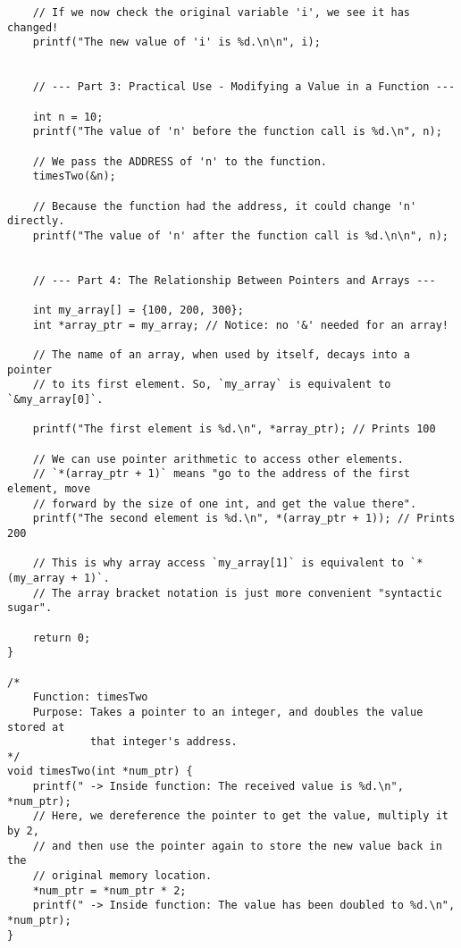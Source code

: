 \documentclass[11pt]{book}
\begin{document}
\begin{verbatim}
    // If we now check the original variable 'i', we see it has changed!
    printf("The new value of 'i' is %d.\n\n", i);


    // --- Part 3: Practical Use - Modifying a Value in a Function ---

    int n = 10;
    printf("The value of 'n' before the function call is %d.\n", n);

    // We pass the ADDRESS of 'n' to the function.
    timesTwo(&n);

    // Because the function had the address, it could change 'n' directly.
    printf("The value of 'n' after the function call is %d.\n\n", n);


    // --- Part 4: The Relationship Between Pointers and Arrays ---

    int my_array[] = {100, 200, 300};
    int *array_ptr = my_array; // Notice: no '&' needed for an array!

    // The name of an array, when used by itself, decays into a pointer
    // to its first element. So, `my_array` is equivalent to `&my_array[0]`.

    printf("The first element is %d.\n", *array_ptr); // Prints 100

    // We can use pointer arithmetic to access other elements.
    // `*(array_ptr + 1)` means "go to the address of the first element, move
    // forward by the size of one int, and get the value there".
    printf("The second element is %d.\n", *(array_ptr + 1)); // Prints 200

    // This is why array access `my_array[1]` is equivalent to `*(my_array + 1)`.
    // The array bracket notation is just more convenient "syntactic sugar".

    return 0;
}

/*
    Function: timesTwo
    Purpose: Takes a pointer to an integer, and doubles the value stored at
             that integer's address.
*/
void timesTwo(int *num_ptr) {
    printf(" -> Inside function: The received value is %d.\n", *num_ptr);
    // Here, we dereference the pointer to get the value, multiply it by 2,
    // and then use the pointer again to store the new value back in the
    // original memory location.
    *num_ptr = *num_ptr * 2;
    printf(" -> Inside function: The value has been doubled to %d.\n", *num_ptr);
}

\end{verbatim}
\clearpage
\end{document}
